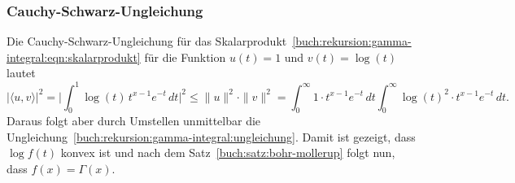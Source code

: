\subsubsection{Cauchy-Schwarz-Ungleichung}
Die Cauchy-Schwarz-Ungleichung für das
Skalarprodukt~\eqref{buch:rekursion:gamma-integral:eqn:skalarprodukt}
für die Funktion $u(t)=1$ und $v(t)=\log(t)$
lautet
\[
|\langle u,v\rangle|^2
=
\biggl|
\int_0^1 \log(t)\,t^{x-1}e^{-t}\,dt
\biggr|^2
\le
\|u\|^2\cdot \|v\|^2
=
\int_0^\infty 1\cdot t^{x-1}e^{-t}\,dt
\int_0^\infty \log(t)^2\cdot t^{x-1}e^{-t}\,dt.
\]
Daraus folgt aber durch Umstellen unmittelbar die
Ungleichung~\eqref{buch:rekursion:gamma-integral:ungleichung}.
Damit ist gezeigt, dass $\log f(t)$ konvex ist und nach
dem Satz~\ref{buch:satz:bohr-mollerup} folgt nun, dass $f(x)=\Gamma(x)$.

